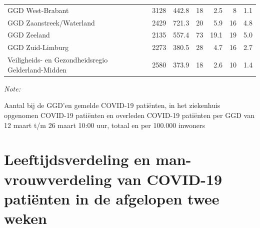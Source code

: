 \documentclass[
  english,
  man,floatsintext]{apa6}
\begin{document}
\begin{table}
\begin{threeparttable}
\begin{tabular}{lrrrrrr}
GGD West-Brabant & 3128 & 442.8 & 18 & 2.5 & 8 & 1.1\\
GGD Zaanstreek/Waterland & 2429 & 721.3 & 20 & 5.9 & 16 & 4.8\\
GGD Zeeland & 2135 & 557.4 & 73 & 19.1 & 19 & 5.0\\
GGD Zuid-Limburg & 2273 & 380.5 & 28 & 4.7 & 16 & 2.7\\
Veiligheids- en Gezondheidsregio Gelderland-Midden & 2580 & 373.9 & 18 & 2.6 & 10 & 1.4\\
\bottomrule
\end{tabular}
\begin{tablenotes}
\item \textit{Note: } 
\item Aantal bij de GGD’en gemelde COVID-19 patiënten, in het ziekenhuis opgenomen COVID-19 patiënten en overleden COVID-19 patiënten per GGD van 12 maart t/m 26 maart 10:00 uur, totaal en per 100.000 inwoners
\end{tablenotes}
\end{threeparttable}
\endgroup{}
\end{table}

\newpage

\hypertarget{leeftijdsverdeling-en-man-vrouwverdeling-van-covid-19-patiuxebnten-in-de-afgelopen-twee-weken}{%
\section{Leeftijdsverdeling en man-vrouwverdeling van COVID-19 patiënten in de afgelopen twee weken}\label{leeftijdsverdeling-en-man-vrouwverdeling-van-covid-19-patiuxebnten-in-de-afgelopen-twee-weken}}
\end{document}
